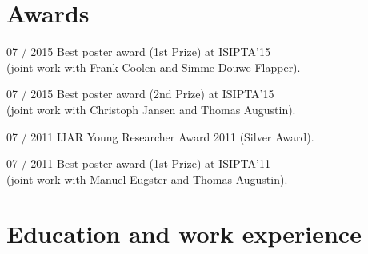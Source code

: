 \documentclass[a4paper]{simplecv}
\begin{document}
\section{Awards}
\label{awards}
\begin{topic}
\item[07 / 2015] Best poster award (1st Prize) at ISIPTA'15\\
                 (joint work with Frank Coolen and Simme Douwe Flapper).
\item[07 / 2015] Best poster award (2nd Prize) at ISIPTA'15\\
                 (joint work with Christoph Jansen and Thomas Augustin).
\item[07 / 2011] IJAR Young Researcher Award 2011 (Silver Award).
\item[07 / 2011] Best poster award (1st Prize) at ISIPTA'11\\
                 (joint work with Manuel Eugster and Thomas Augustin).
\end{topic}


\newpage
\section{Education and work experience}
\label{education}

\end{document}
